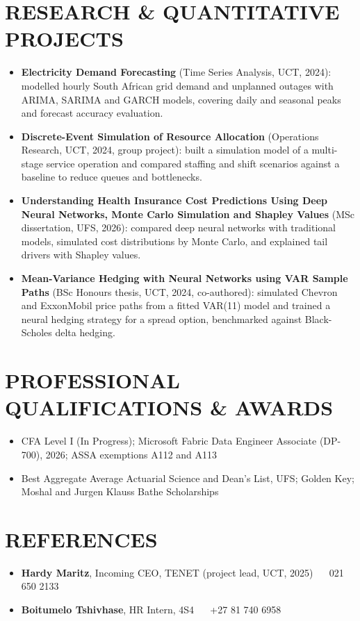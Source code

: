 \documentclass[letterpaper,11pt]{article}
\newcommand{\resumeItem}[1]{
  \item\small{
    {#1 \vspace{-1pt}}
  }
}
\newcommand{\resumeItemListStart}{\begin{itemize}[leftmargin=0.1in]}
\newcommand{\resumeItemListEnd}{\end{itemize}\vspace{-5pt}}
\begin{document}
\section{RESEARCH \& QUANTITATIVE PROJECTS}
\vspace{4pt}
\resumeItemListStart
    \resumeItem{\small{\textbf{Electricity Demand Forecasting} (Time Series Analysis, UCT, 2024): modelled hourly South African grid demand and unplanned outages with ARIMA, SARIMA and GARCH models, covering daily and seasonal peaks and forecast accuracy evaluation.}}
    \resumeItem{\small{\textbf{Discrete-Event Simulation of Resource Allocation} (Operations Research, UCT, 2024, group project): built a simulation model of a multi-stage service operation and compared staffing and shift scenarios against a baseline to reduce queues and bottlenecks.}}
    \resumeItem{\small{\textbf{Understanding Health Insurance Cost Predictions Using Deep Neural Networks, Monte Carlo Simulation and Shapley Values} (MSc dissertation, UFS, 2026): compared deep neural networks with traditional models, simulated cost distributions by Monte Carlo, and explained tail drivers with Shapley values.}}
    \resumeItem{\small{\textbf{Mean-Variance Hedging with Neural Networks using VAR Sample Paths} (BSc Honours thesis, UCT, 2024, co-authored): simulated Chevron and ExxonMobil price paths from a fitted VAR(11) model and trained a neural hedging strategy for a spread option, benchmarked against Black-Scholes delta hedging.}}
\resumeItemListEnd
\vspace{-4pt}

\section{PROFESSIONAL QUALIFICATIONS \& AWARDS}
\vspace{4pt}
\resumeItemListStart
    \resumeItem{\small{CFA Level I (In Progress); Microsoft Fabric Data Engineer Associate (DP-700), 2026; ASSA exemptions A112 and A113}}
    \vspace{-3pt}
    \resumeItem{\small{Best Aggregate Average Actuarial Science and Dean's List, UFS; Golden Key; Moshal and Jurgen Klauss Bathe Scholarships}}
\resumeItemListEnd

\section{REFERENCES}
\vspace{4pt}
\resumeItemListStart
    \resumeItem{\small{\textbf{Hardy Maritz}, Incoming CEO, TENET (project lead, UCT, 2025) ~\textbar~ 021 650 2133 ~\textbar~ \href{mailto:hardy.maritz@uct.ac.za}{\color{blue}{hardy.maritz@uct.ac.za}}}}
    \vspace{-3pt}
    \resumeItem{\small{\textbf{Boitumelo Tshivhase}, HR Intern, 4S4 ~\textbar~ +27 81 740 6958 ~\textbar~ \href{mailto:boitumelotshivhase@icloud.com}{\color{blue}{boitumelotshivhase@icloud.com}}}}
\resumeItemListEnd
\end{document}
